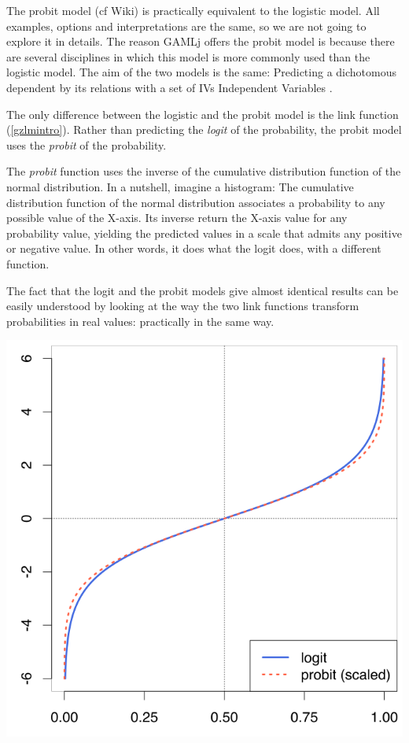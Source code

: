\documentclass[
]{book}
\begin{document}
The probit model (cf Wiki) is practically equivalent to the logistic model. All examples, options and interpretations are the same, so we are not going to explore it in details. The reason {GAMLj} offers the probit model is because there are several disciplines in which this model is more commonly used than the logistic model. The aim of the two models is the same: Predicting a dichotomous dependent by its relations with a set of {IVs {Independent Variables} }.

The only difference between the logistic and the probit model is the link function (\ref{gzlmintro}). Rather than predicting the \emph{logit} of the probability, the probit model uses the \emph{probit} of the probability.

The \emph{probit} function uses the inverse of the cumulative distribution function of the normal distribution. In a nutshell, imagine a histogram: The cumulative distribution function of the normal distribution associates a probability to any possible value of the X-axis. Its inverse return the X-axis value for any probability value, yielding the predicted values in a scale that admits any positive or negative value. In other words, it does what the logit does, with a different function.

The fact that the logit and the probit models give almost identical results can be easily understood by looking at the way the two link functions transform probabilities in real values: practically in the same way.

\includegraphics{bookletpics/logitprobit.png}
\end{document}
